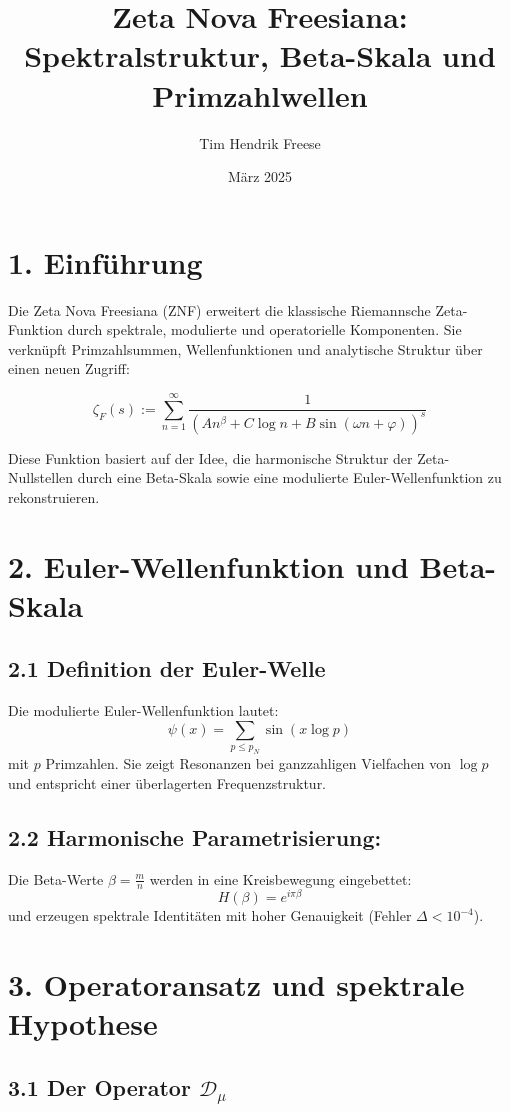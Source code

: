\documentclass[12pt]{article}
\title{\textbf{Zeta Nova Freesiana: Spektralstruktur, Beta-Skala und Primzahlwellen}}
\author{Tim Hendrik Freese}
\date{März 2025}
\begin{document}
\maketitle

\section*{1. Einführung}

Die Zeta Nova Freesiana (ZNF) erweitert die klassische Riemannsche Zeta-Funktion durch spektrale, modulierte und operatorielle Komponenten. Sie verknüpft Primzahlsummen, Wellenfunktionen und analytische Struktur über einen neuen Zugriff:

\[
\zeta_F(s) := \sum_{n=1}^\infty \frac{1}{(A n^\beta + C \log n + B \sin(\omega n + \varphi))^s}
\]

Diese Funktion basiert auf der Idee, die harmonische Struktur der Zeta-Nullstellen durch eine Beta-Skala sowie eine modulierte Euler-Wellenfunktion zu rekonstruieren.

\section*{2. Euler-Wellenfunktion und Beta-Skala}

\subsection*{2.1 Definition der Euler-Welle}
Die modulierte Euler-Wellenfunktion lautet:
\[
\psi(x) = \sum_{p \leq p_N} \sin(x \log p)
\]
mit \(p\) Primzahlen. Sie zeigt Resonanzen bei ganzzahligen Vielfachen von \(\log p\) und entspricht einer überlagerten Frequenzstruktur.

\subsection*{2.2 Harmonische Parametrisierung:}
Die Beta-Werte \( \beta = \frac{m}{n} \) werden in eine Kreisbewegung eingebettet:
\[
H(\beta) = e^{i \pi \beta}
\]
und erzeugen spektrale Identitäten mit hoher Genauigkeit (Fehler \(\Delta < 10^{-4}\)).

\section*{3. Operatoransatz und spektrale Hypothese}

\subsection*{3.1 Der Operator \(\mathcal{D}_\mu\)}
\end{document}
